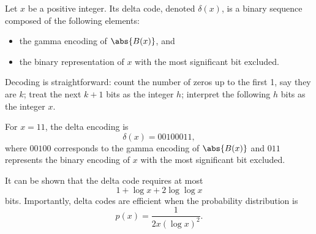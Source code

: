 \documentclass{subfiles}
\begin{document}
    Let \(x\) be a positive integer. Its delta code, denoted \(\delta(x)\), 
        is a binary sequence composed of the following elements:
        \begin{itemize}
            \item the gamma encoding of \(\abs{B(x)}\), and
            \item the binary representation of \(x\) with the most significant 
                  bit excluded.
        \end{itemize}

    Decoding is straightforward: count the number of zeros up to the first 1, 
        say they are \(k\); treat the next \(k + 1\) bits as the integer \(h\);
        interpret the following \(h\) bits as the integer \(x\).

    \begin{example*}
        For \(x = 11\), the delta encoding is
        \[
            \delta(x) = 00100 011,
        \]
        where \(00100\) corresponds to the gamma encoding of \(\abs{B(x)}\) 
        and \(011\) represents the binary encoding of \(x\) with the most 
        significant bit excluded.
    \end{example*}

    It can be shown that 
        the delta code requires at most 
        \[
            1 + \log x + 2 \log \log x
        \] 
        bits. Importantly, delta codes are efficient when the probability 
        distribution is 
        \[
            p(x) = \frac{1}{2 x (\log x)^{2}}.
        \]
\end{document}
